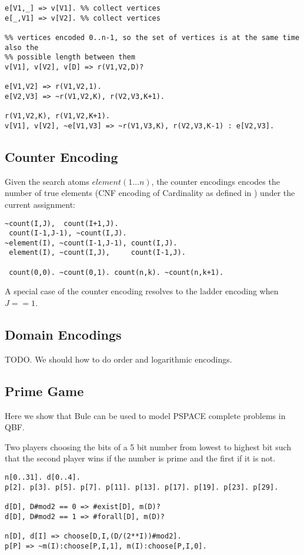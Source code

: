 \documentclass[conference]{IEEEtran}
\begin{document}
\begin{lstlisting}
e[V1,_] => v[V1]. %% collect vertices
e[_,V1] => v[V2]. %% collect vertices

%% vertices encoded 0..n-1, so the set of vertices is at the same time also the
%% possible length between them 
v[V1], v[V2], v[D] => r(V1,V2,D)?

e[V1,V2] => r(V1,V2,1). 
e[V2,V3] => ~r(V1,V2,K), r(V2,V3,K+1). 

r(V1,V2,K), r(V1,V2,K+1). 
v[V1], v[V2], ~e[V1,V3] => ~r(V1,V3,K), r(V2,V3,K-1) : e[V2,V3].
\end{lstlisting}

\subsection{Counter Encoding}

Given the search atoms $element(1\ldots n)$, the counter encodings encodes the
number of true elements (CNF encoding of Cardinality as defined in \cite{Sinz05})
under the current assignment:

\begin{lstlisting}
~count(I,J),  count(I+1,J).
 count(I-1,J-1), ~count(I,J).
~element(I), ~count(I-1,J-1), count(I,J).
 element(I), ~count(I,J),     count(I-1,J).

 count(0,0). ~count(0,1). count(n,k). ~count(n,k+1).
\end{lstlisting}

A special case of the counter encoding resolves to the ladder encoding when $J==1$. 

\subsection{Domain Encodings}

TODO. We should how to do order and logarithmic encodings. 

\subsection{Prime Game}

Here we show that Bule can be used to model PSPACE complete problems in QBF. 

Two players choosing the bits of a 5 bit number from lowest to highest bit such that 
the second player wins if the number is prime and the first if it is not. 
\begin{lstlisting}
n[0..31]. d[0..4].
p[2]. p[3]. p[5]. p[7]. p[11]. p[13]. p[17]. p[19]. p[23]. p[29].

d[D], D#mod2 == 0 => #exist[D], m(D)?
d[D], D#mod2 == 1 => #forall[D], m(D)?

n[D], d[I] => choose[D,I,(D/(2**I))#mod2]. 
p[P] => ~m(I):choose[P,I,1], m(I):choose[P,I,0].
\end{lstlisting}
\end{document}
